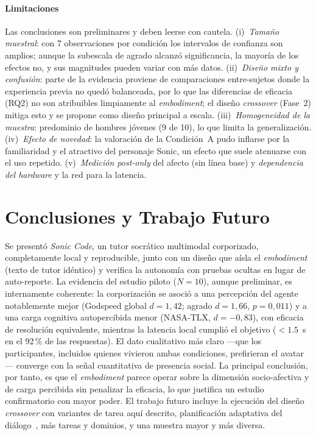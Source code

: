 \documentclass[conference]{IEEEtran}
\begin{document}
\paragraph{Limitaciones}
Las conclusiones son preliminares y deben leerse con cautela. (i)~\emph{Tama\~no muestral}: con 7
observaciones por condici\'on los intervalos de confianza son amplios; aunque la subescala de
agrado alcanz\'o significancia, la mayor\'ia de los efectos no, y sus magnitudes pueden variar con
m\'as datos. (ii)~\emph{Dise\~no mixto y confusi\'on}: parte de la evidencia proviene de
comparaciones entre-sujetos donde la experiencia previa no qued\'o balanceada, por lo que las
diferencias de eficacia (RQ2) no son atribuibles limpiamente al \emph{embodiment}; el dise\~no
\emph{crossover} (Fase~2) mitiga esto y se propone como dise\~no principal a escala.
(iii)~\emph{Homogeneidad de la muestra}: predominio de hombres j\'ovenes (9 de 10), lo que limita la
generalizaci\'on. (iv)~\emph{Efecto de novedad}: la valoraci\'on de la Condici\'on~A pudo inflarse
por la familiaridad y el atractivo del personaje Sonic, un efecto que suele atenuarse con el uso
repetido. (v)~\emph{Medici\'on \emph{post-only}} del afecto (sin l\'inea base) y \emph{dependencia
del hardware} y la red para la latencia.

\section{Conclusiones y Trabajo Futuro}
\label{sec:conclusion}
Se present\'o \emph{Sonic Code}, un tutor socr\'atico multimodal corporizado, completamente local y
reproducible, junto con un dise\~no que a\'isla el \emph{embodiment} (texto de tutor id\'entico) y
verifica la autonom\'ia con pruebas ocultas en lugar de auto-reporte. La evidencia del estudio
piloto ($N=10$), aunque preliminar, es internamente coherente: la corporizaci\'on se asoci\'o a una
percepci\'on del agente notablemente mejor (Godspeed global $d=1{,}42$; agrado $d=1{,}66$,
$p=0{,}011$) y a una carga cognitiva autopercibida menor (NASA-TLX, $d=-0{,}83$), con eficacia de
resoluci\'on equivalente, mientras la latencia local cumpli\'o el objetivo ($<1.5$~s en el 92\,\%
de las respuestas). El dato cualitativo m\'as claro ---que los participantes, incluidos quienes
vivieron ambas condiciones, prefirieran el avatar--- converge con la se\~nal cuantitativa de
presencia social. La principal conclusi\'on, por tanto, es que el \emph{embodiment} parece operar
sobre la dimensi\'on socio-afectiva y de carga percibida sin penalizar la eficacia, lo que
justifica un estudio confirmatorio con mayor poder. El trabajo
futuro incluye la ejecuci\'on del dise\~no \emph{crossover} con variantes de tarea aqu\'i descrito,
planificaci\'on adaptativa del di\'alogo~\cite{dong2026learning}, m\'as tareas y dominios, y una
muestra mayor y m\'as diversa.
\end{document}
